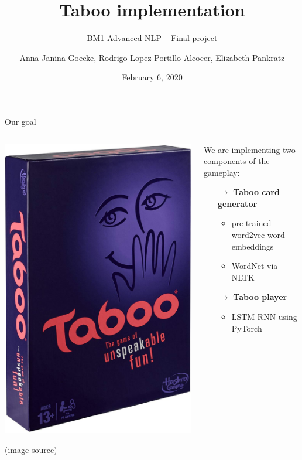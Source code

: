 \documentclass[11pt]{beamer}
\title{Taboo implementation}
\subtitle{BM1 Advanced NLP -- Final project}
\date{February 6, 2020}
\author{Anna-Janina Goecke, \newline Rodrigo Lopez Portillo Alcocer, \newline Elizabeth Pankratz \newline}
\institute{Universität Potsdam}
\begin{document}
	
\maketitle


\begin{frame}{Our goal}

\begin{columns}

\begin{column}{0.5\textwidth}

	\begin{center}
		\includegraphics[width=.6\linewidth]{taboo.jpg}
	\end{center}
		
	\vfill 
	{\tiny \href{https://www.amazon.com/Hasbro-A4626-Taboo-Board-Game/dp/B00D4NJSBW}{(image source)} }

\end{column}

\begin{column}{0.5\textwidth}

	We are implementing two components of the gameplay:
	
	\begin{itemize}
		\item[$\rightarrow$] \textbf{Taboo card generator}
		\begin{itemize}
			\item pre-trained word2vec word embeddings
			\item WordNet via NLTK
		\end{itemize}
		\item[$\rightarrow$] \textbf{Taboo player}
		\begin{itemize}
			\item LSTM RNN using PyTorch
		\end{itemize}
	\end{itemize}


\end{column}
\end{columns}
\end{frame}
\end{document}
